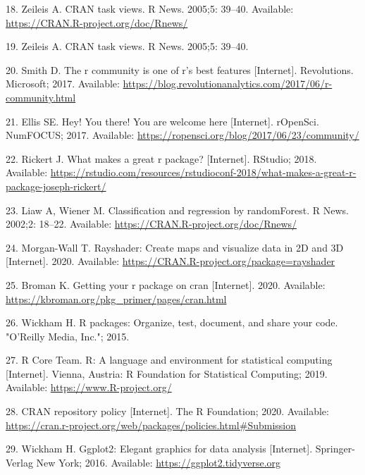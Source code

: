\documentclass[10pt,letterpaper]{article}
\begin{document}
\leavevmode\hypertarget{ref-ctv}{}%
18. Zeileis A. CRAN task views. R News. 2005;5: 39--40. Available:
\url{https://CRAN.R-project.org/doc/Rnews/}

\leavevmode\hypertarget{ref-zeileis2005}{}%
19. Zeileis A. CRAN task views. R News. 2005;5: 39--40.

\leavevmode\hypertarget{ref-smith2017}{}%
20. Smith D. The r community is one of r's best features {[}Internet{]}.
Revolutions. Microsoft; 2017. Available:
\url{https://blog.revolutionanalytics.com/2017/06/r-community.html}

\leavevmode\hypertarget{ref-ellis2017}{}%
21. Ellis SE. Hey! You there! You are welcome here {[}Internet{]}.
rOpenSci. NumFOCUS; 2017. Available:
\url{https://ropensci.org/blog/2017/06/23/community/}

\leavevmode\hypertarget{ref-rickert2018}{}%
22. Rickert J. What makes a great r package? {[}Internet{]}. RStudio;
2018. Available:
\url{https://rstudio.com/resources/rstudioconf-2018/what-makes-a-great-r-package-joseph-rickert/}

\leavevmode\hypertarget{ref-randomforest}{}%
23. Liaw A, Wiener M. Classification and regression by randomForest. R
News. 2002;2: 18--22. Available:
\url{https://CRAN.R-project.org/doc/Rnews/}

\leavevmode\hypertarget{ref-rayshader}{}%
24. Morgan-Wall T. Rayshader: Create maps and visualize data in 2D and
3D {[}Internet{]}. 2020. Available:
\url{https://CRAN.R-project.org/package=rayshader}

\leavevmode\hypertarget{ref-broman2020}{}%
25. Broman K. Getting your r package on cran {[}Internet{]}. 2020.
Available: \url{https://kbroman.org/pkg_primer/pages/cran.html}

\leavevmode\hypertarget{ref-wickham2015}{}%
26. Wickham H. R packages: Organize, test, document, and share your
code. "O'Reilly Media, Inc."; 2015.

\leavevmode\hypertarget{ref-baseR}{}%
27. R Core Team. R: A language and environment for statistical computing
{[}Internet{]}. Vienna, Austria: R Foundation for Statistical Computing;
2019. Available: \url{https://www.R-project.org/}

\leavevmode\hypertarget{ref-cranpolicy2020}{}%
28. CRAN repository policy {[}Internet{]}. The R Foundation; 2020.
Available:
\url{https://cran.r-project.org/web/packages/policies.html\#Submission}

\leavevmode\hypertarget{ref-ggplot2}{}%
29. Wickham H. Ggplot2: Elegant graphics for data analysis
{[}Internet{]}. Springer-Verlag New York; 2016. Available:
\url{https://ggplot2.tidyverse.org}
\end{document}
